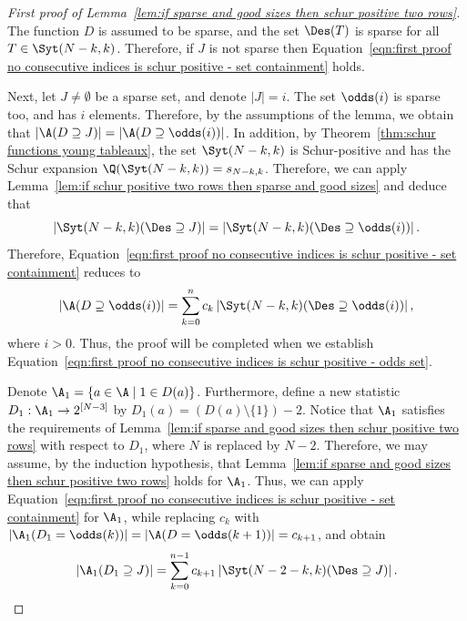 \begin{proof}[First proof of Lemma~\ref{lem:if sparse and good sizes then schur positive two rows}]
    The function $D$ is assumed to be sparse, and the set $\Des(T)$ is sparse for all $T \in \Syt(N-k,k)$. Therefore, if $J$ is not sparse then Equation~\eqref{eqn:first proof no consecutive indices is schur positive - set containment} holds.

    Next, let $J \ne \emptyset$ be a sparse set, and denote $|J| = i$. The set $\odds(i)$ is sparse too, and has $i$ elements. Therefore, by the assumptions of the lemma, we obtain that $\left|\A(D \supseteq J)\right| = \left|\A(D \supseteq \odds(i))\right|$.
    In addition, by Theorem~\ref{thm:schur functions young tableaux}, the set $\Syt(N-k,k)$ is Schur-positive and has the Schur expansion $\Q(\Syt(N-k,k)) = s_{N-k,k}$. Therefore, we can apply Lemma~\ref{lem:if schur positive two rows then sparse and good sizes} and deduce that
    \[
        \left|\Syt(N-k,k)(\Des \supseteq J)\right| = \left|\Syt(N-k,k)(\Des \supseteq \odds(i))\right|.
    \]
    Therefore, Equation~\ref{eqn:first proof no consecutive indices is schur positive - set containment} reduces to
    \begin{equation}\label{eqn:first proof no consecutive indices is schur positive - odds set}
        \left|\A(D \supseteq \odds(i))\right| = \sum_{k=0}^n c_k \left|\Syt(N-k,k)(\Des \supseteq \odds(i))\right|,
    \end{equation}
    where $i > 0$. Thus, the proof will be completed when we establish Equation~\eqref{eqn:first proof no consecutive indices is schur positive - odds set}.
    
    Denote $\A_1 = \{a \in \A \mid 1\in D(a)\}$. Furthermore, define a new statistic $D_1:\A_1 \to 2^{[N-3]}$ by $D_1(a) = (D(a)\setminus\{1\})-2$. Notice that $\A_1$ satisfies the requirements of Lemma~\ref{lem:if sparse and good sizes then schur positive two rows} with respect to $D_1$, where $N$ is replaced by $N-2$. Therefore, we may assume, by the induction hypothesis, that Lemma~\ref{lem:if sparse and good sizes then schur positive two rows} holds for $\A_1$. Thus, we can apply Equation~\eqref{eqn:first proof no consecutive indices is schur positive - set containment} for $\A_1$, while replacing $c_k$ with $|\A_1(D_1 = \odds(k))| = |\A(D = \odds(k+1))| = c_{k+1}$, and obtain
    \begin{equation}\label{eqn:first proof no consecutive indices is schur positive - induction}
        \left|\A_1(D_1 \supseteq J)\right| = \sum_{k=0}^{n-1} c_{k+1} \left|\Syt(N-2-k,k)(\Des \supseteq J)\right|.
    \end{equation}
    

\end{proof}
